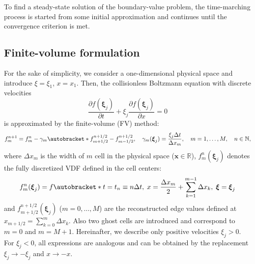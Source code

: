 \documentclass{elsarticle} %
\newcommand{\pder}[2][]{\frac{\partial#1}{\partial#2}}
\DeclarePairedDelimiter\autobracket()       %
\newcommand{\br}[1]{\autobracket*{#1}}
\newcommand{\bxi}{\boldsymbol{\xi}}
\newcommand{\bx}{\boldsymbol{x}}
\begin{document}
To find a steady-state solution of the boundary-value problem,
the time-marching process is started from some initial approximation
and continues until the convergence criterion is met.

\subsection{Finite-volume formulation}\label{sec:numerics:fv}

For the sake of simplicity, we consider a one-dimensional physical space
and introduce \(\xi=\xi_1\), \(x=x_1\).
Then, the collisionless Boltzmann equation with discrete velocities
\begin{equation}\label{eq:transport}
    \pder[f(\bxi_j)]{t} + \xi_j\pder[f(\bxi_j)]{x} = 0
\end{equation}
is approximated by the finite-volume (FV) method:
\begin{equation}\label{eq:finite_volume}
    f^{n+1}_m = f^n_m - \gamma_m\br{f^{n+1/2}_{m+1/2} - f^{n+1/2}_{m-1/2}}, \quad
    \gamma_m(\bxi_j) = \frac{\xi_j\Delta{t}}{\Delta{x_m}}, \quad
    m = 1,\dots,M, \quad n\in\mathbb{N},
\end{equation}
where \(\Delta{x_m}\) is the width of \(m\) cell in the physical space (\(\bx\in\mathbb{R}\)),
\(f^n_m(\bxi_j)\) denotes the fully discretized VDF defined in the cell centers:
\begin{equation}\label{eq:vdf_fv}
    f^n_m(\bxi_j) = f\br{
        t = t_n \equiv n\Delta{t}, \;
        x = \frac{\Delta{x_m}}2 + \sum_{k=1}^{m-1}\Delta{x_k}, \;
        \bxi = \bxi_j
    }
\end{equation}
and \(f^{n+1/2}_{m+1/2}(\bxi_j)\) (\(m = 0,\dots,M\)) are the reconstructed edge values
defined at \(x_{m+1/2} = \sum_{k=0}^m\Delta{x_k}\).
Also two ghost cells are introduced and correspond to \(m=0\) and \(m=M+1\).
Hereinafter, we describe only positive velocities \(\xi_j>0\).
For \(\xi_j<0\), all expressions are analogous
and can be obtained by the replacement \(\xi_j\to-\xi_j\) and \(x\to-x\).
\end{document}
